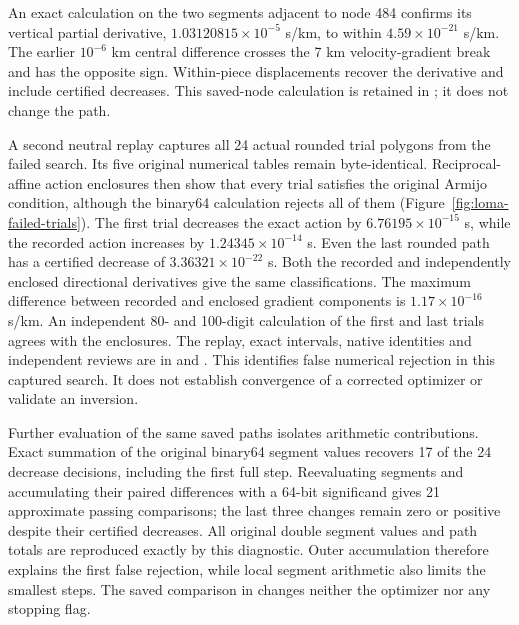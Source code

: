 An exact calculation on the two segments adjacent to node 484 confirms its
vertical partial derivative, $1.03120815\times10^{-5}$ s/km, to within
$4.59\times10^{-21}$ s/km. The earlier $10^{-6}$ km central difference
crosses the 7 km velocity-gradient break and has the opposite sign.
Within-piece displacements recover the derivative and include certified
decreases. This saved-node calculation is retained in
; it does not change the path.

A second neutral replay captures all 24 actual rounded trial polygons from
the failed search. Its five original numerical tables remain byte-identical.
Reciprocal-affine action enclosures then show that every trial satisfies the
original Armijo condition, although the binary64 calculation rejects all of
them (Figure~\ref{fig:loma-failed-trials}). The first trial decreases the exact
action by $6.76195\times10^{-15}$ s, while the recorded action increases by
$1.24345\times10^{-14}$ s. Even the last rounded path has a certified decrease
of $3.36321\times10^{-22}$ s. Both the recorded and independently enclosed
directional derivatives give the same classifications. The maximum difference
between recorded and enclosed gradient components is $1.17\times10^{-16}$ s/km.
An independent 80- and 100-digit calculation of the first and last trials
agrees with the enclosures. The replay, exact intervals, native identities
and independent reviews are in
 and
.
This identifies false numerical rejection in this captured search. It does
not establish convergence of a corrected optimizer or validate an inversion.

Further evaluation of the same saved paths isolates arithmetic contributions.
Exact summation of the original binary64 segment values recovers 17 of the
24 decrease decisions, including the first full step. Reevaluating segments
and accumulating their paired differences with a 64-bit significand gives
21 approximate passing comparisons; the last three changes remain zero or
positive despite their certified decreases. All original
double segment values and path totals are reproduced exactly by this
diagnostic. Outer accumulation therefore explains the first false rejection,
while local segment arithmetic also limits the smallest steps. The saved
comparison in  changes
neither the optimizer nor any stopping flag.

